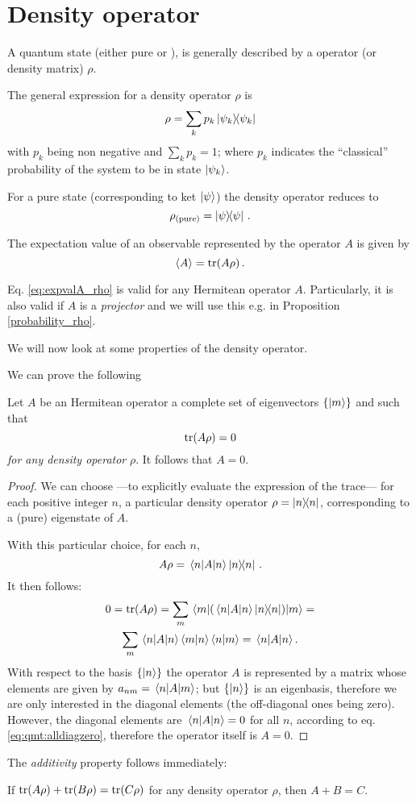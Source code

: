 \section{Density operator}\label{app:density}

A quantum state (either pure or ),
is generally described by a  operator (or density matrix) $\rho$.

The general expression for a density operator $\rho$ is
$$
  \rho = \sum_{k}p_{k}\ketbra{\psi_{k}}
$$
with $p_{k}$ being non negative and $\sum_{k}p_{k} = 1$;
where $p_k$ indicates the ``classical'' probability of the system to be in state $\ket{\psi_{k}}$.

For a pure state (corresponding to ket $\ket{\psi}$) the density operator reduces to
\[
  \rho_{(\text{pure})} = \ketbra{\psi}\,\text{.}
\]

The expectation value of an observable represented by the operator $A$
is given by \parencite{BlumDensity, FanoDensity}
\begin{equation}\label{eq:expvalA_rho}
  \expval{A} = \tr(A\rho)\,.
\end{equation}

Eq. \eqref{eq:expvalA_rho} is valid for any Hermitean operator $A$. Particularly,
it is also valid if $A$ is a \emph{projector} and we will use this
e.g. in Proposition \ref{probability_rho}.

We will now look at some properties of the density operator.

We can prove the following
\begin{proposition}
  Let $A$ be an Hermitean operator
  a complete set of eigenvectors $\{\ket{m}\}$
  and
  such that
  $$
    \tr(A\rho) = 0 
  $$
  \emph{for any density operator} $\rho$.
  It follows that $A = 0$.

  \begin{proof}
    We can choose
    ---to explicitly evaluate the expression of the trace---
    for each positive integer $n$,
    a particular density operator $\rho = \ketbra{n}$,
    corresponding to a (pure) eigenstate of $A$.

    With this particular choice,
    for each $n$,
    $$
      A\rho = \mel{n}{A}{n}\ketbra{n}\,.
    $$
    It then follows:
    \begin{multline}\label{eq:qmt:alldiagzero}
      0 = \tr(A\rho) = \sum_{m}\mel{m}{ ( \mel{n}{A}{n}\ketbra{n} ) }{m} = \\
          \sum_{m} \mel{n}{A}{n} \braket{m}{n} \braket{n}{m}
        = \mel{n}{A}{n} .
    \end{multline}
    With respect to the basis $\left\{\ket{n}\right\}$ the operator $A$ is
    represented by a matrix whose elements are given by $a_{nm} = \mel{n}{A}{m}$;
    but $\left\{\ket{n}\right\}$ is an eigenbasis, therefore we are only interested in the diagonal
    elements (the off-diagonal ones being zero).
    However, the diagonal elements are  $\mel{n}{A}{n} = 0$
    for all $n$, according to eq. \eqref{eq:qmt:alldiagzero}, therefore the operator itself is $A=0$.
  \end{proof}
\end{proposition}

The \emph{additivity} property follows immediately:

\begin{corollary}
If $\tr(A\rho) + \tr(B\rho) = \tr(C\rho)$ for any density operator $\rho$,
then $A + B = C$.
\end{corollary}
